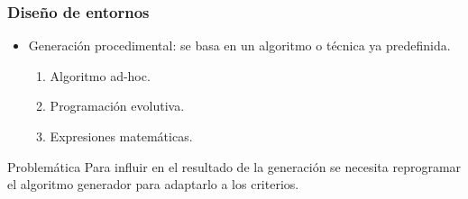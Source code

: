 \begin{frame}
	\frametitle{Diseño de entornos}
	
	\begin{itemize}
		\item<1-> \textcolor{UDCpink}{Generación procedimental}: se basa en un algoritmo o técnica ya predefinida.
		
		\vspace{1em}
		
		\begin{enumerate}
			\item<2-> Algoritmo ad-hoc.
			
			\vspace{0.5em}
			
			\item<3-> Programación evolutiva.
			
			\vspace{0.5em}
			
			\item<4-> Expresiones matemáticas.
		\end{enumerate}
	\end{itemize}
	
	\vspace{1em}
	
	\pause[5]
	
	\begin{block}{\normalsize Problemática}
		\vspace{1em}
		Para \textcolor{UDCpink}{influir} en el resultado de la generación se necesita \textcolor{UDCpink}{reprogramar} el algoritmo generador para adaptarlo a los criterios.
		\vspace{1em}
	\end{block}
\end{frame}

